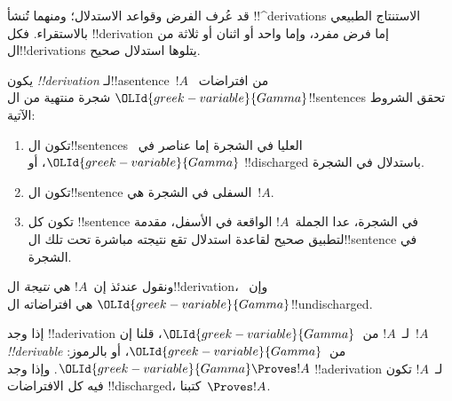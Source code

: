 \documentclass[../../../include/open-logic-section]{subfiles}
\begin{document}
      {}
      {}


\begin{explain}
قد عُرف الفرض وقواعد الاستدلال؛ ومنهما تُنشأ
!!^{derivation}s الاستنتاج الطبيعي بالاستقراء.
فكل !!{derivation} إما فرض مفرد، وإما واحد أو اثنان أو ثلاثة من ال!!{derivation}s يتلوها استدلال صحيح.
\end{explain}

\begin{defn}[!!^{derivation}]
يكون  \emph{!!{derivation}} لـ!!a{sentence}~$!A$
من افتراضات~${\OLId{greek-variable}{Gamma}}$ شجرة منتهية من ال!!{sentence}s تحقق الشروط الآتية:
\begin{enumerate}
\item تكون ال!!{sentence}s العليا في الشجرة إما عناصر في~${\OLId{greek-variable}{Gamma}}$، أو
  !!{discharged} باستدلال في الشجرة.
\item تكون ال!!{sentence} السفلى في الشجرة هي~$!A$.
\item تكون كل !!{sentence} في الشجرة، عدا الجملة~$!A$ الواقعة في
  الأسفل، مقدمة لتطبيق صحيح لقاعدة استدلال تقع نتيجته مباشرة تحت تلك
  ال!!{sentence} في الشجرة.
\end{enumerate}
ونقول عندئذ إن~$!A$ هي \emph{نتيجة} ال!!{derivation}، وإن~${\OLId{greek-variable}{Gamma}}$ هي
افتراضاته ال!!{undischarged}.

إذا وجد !!a{derivation} لـ~$!A$ من~${\OLId{greek-variable}{Gamma}}$، قلنا إن~$!A$
\emph{!!{derivable}} من~${\OLId{greek-variable}{Gamma}}$، أو بالرموز: ${\OLId{greek-variable}{Gamma}} \Proves !A$.
وإذا وجد !!a{derivation} لـ~$!A$ تكون فيه كل الافتراضات
!!{discharged}، كتبنا~$\Proves !A$.
\end{defn}
\end{document}
